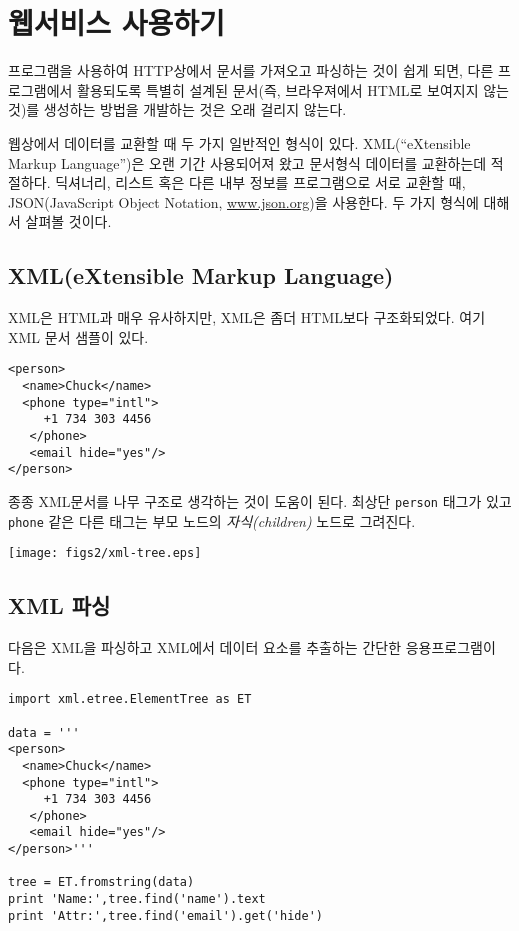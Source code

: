 
\chapter{웹서비스 사용하기}
프로그램을 사용하여 HTTP상에서 문서를 가져오고 파싱하는 것이 쉽게 되면, 다른 프로그램에서 
활용되도록 특별히 설계된 문서(즉, 브라우져에서 HTML로 보여지지 않는 것)를 생성하는 방법을 개발하는 것은 오래 걸리지 않는다.

웹상에서 데이터를 교환할 때 두 가지 일반적인 형식이 있다.
XML(``eXtensible Markup Language'')은 오랜 기간 사용되어져 왔고 문서형식 데이터를 교환하는데 적절하다.
딕셔너리, 리스트 혹은 다른 내부 정보를 프로그램으로 서로 교환할 때, JSON(JavaScript Object Notation, \url{www.json.org})을 사용한다. 두 가지 형식에 대해서 살펴볼 것이다.

\section{XML(eXtensible Markup Language)}
XML은 HTML과 매우 유사하지만, XML은 좀더 HTML보다 구조화되었다.
여기 XML 문서 샘플이 있다.

\beforeverb
\begin{verbatim}
<person>
  <name>Chuck</name>
  <phone type="intl">
     +1 734 303 4456
   </phone>
   <email hide="yes"/>
</person>
\end{verbatim}
\afterverb
%

종종 XML문서를 나무 구조로 생각하는 것이 도움이 된다. 최상단 {\tt person} 태그가 있고
{\tt phone} 같은 다른 태그는 부모 노드의 \emph{자식(children)} 노드로 그려진다.

\beforefig
\centerline{\texttt{[image: figs2/xml-tree.eps]}}
\afterfig

\section{XML 파싱}


다음은 XML을 파싱하고 XML에서 데이터 요소를 추출하는 간단한 응용프로그램이다.

\beforeverb
\begin{verbatim}
import xml.etree.ElementTree as ET

data = '''
<person>
  <name>Chuck</name>
  <phone type="intl">
     +1 734 303 4456
   </phone>
   <email hide="yes"/>
</person>'''

tree = ET.fromstring(data)
print 'Name:',tree.find('name').text
print 'Attr:',tree.find('email').get('hide')
\end{verbatim}
\afterverb
%

